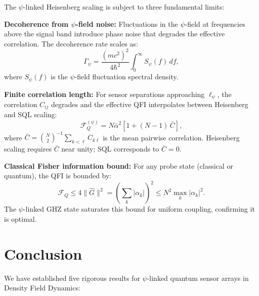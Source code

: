 \documentclass[aps,prl,twocolumn,superscriptaddress,showpacs]{revtex4-2}
\theoremstyle{definition}
\begin{document}
The $\psi$-linked Heisenberg scaling is subject to three fundamental
limits:

\textbf{Decoherence from $\psi$-field noise:}
Fluctuations in the $\psi$-field at frequencies above the signal
band introduce phase noise that degrades the effective correlation.
The decoherence rate scales as:
\begin{equation}
\Gamma_\psi = \frac{(mc^2)^2}{4\hbar^2}\int_0^\infty
S_\psi(f)\,df,
\label{eq:decoherence-rate}
\end{equation}
where $S_\psi(f)$ is the $\psi$-field fluctuation spectral density.

\textbf{Finite correlation length:}
For sensor separations approaching $\ell_\psi$, the correlation
$C_{ij}$ degrades and the effective QFI interpolates between
Heisenberg and SQL scaling:
\begin{equation}
\mathcal{F}_Q^{(\psi)} = N\bar{\alpha}^2\left[
1 + (N-1)\,\bar{C}\right],
\label{eq:intermediate-qfi}
\end{equation}
where $\bar{C} = \binom{N}{2}^{-1}\sum_{k<\ell}C_{k\ell}$ is the
mean pairwise correlation. Heisenberg scaling requires $\bar{C}$ near
unity; SQL corresponds to $\bar{C} = 0$.

\textbf{Classical Fisher information bound:}
For any probe state (classical or quantum), the QFI is bounded by:
\begin{equation}
\mathcal{F}_Q \leq 4\|\hat{G}\|^2
= \left(\sum_k|\alpha_k|\right)^2 \leq N^2\max_k|\alpha_k|^2.
\label{eq:ultimate-bound}
\end{equation}
The $\psi$-linked GHZ state saturates this bound for uniform
coupling, confirming it is optimal.

\section{Conclusion}\label{sec:conclusion}

We have established five rigorous results for $\psi$-linked quantum
sensor arrays in Density Field Dynamics:
\end{document}
